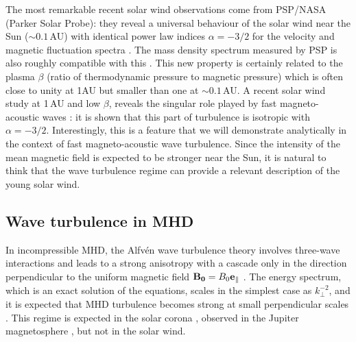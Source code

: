 \documentclass{jpp}
\begin{document}
The most remarkable recent solar wind observations come from PSP/NASA (Parker Solar Probe): they reveal a universal behaviour of the solar wind near the Sun ($\sim 0.1$\,AU) with identical power law indices $\alpha = -3/2$ for the velocity and magnetic fluctuation spectra \citep{Chen2020,Shi2021,Zhao2022}. The mass density spectrum measured by PSP is also roughly compatible with this \citep{Moncuquet2020,Zank2022}. This new property is certainly related to the plasma $\beta$ (ratio of thermodynamic pressure to magnetic pressure) which is often close to unity at 1AU but smaller than one at $\sim 0.1$\,AU. A recent solar wind study at 1\,AU and low $\beta$, reveals the singular role played by fast magneto-acoustic waves \citep{Zhao2022b}: it is shown that this part of turbulence is isotropic with $\alpha = -3/2$. Interestingly, this is a feature that we will demonstrate analytically in the context of fast magneto-acoustic wave turbulence. Since the intensity of the mean magnetic field is expected to be stronger near the Sun, it is natural to think that the wave turbulence regime can provide a relevant description of the young solar wind. 


\subsection{Wave turbulence in MHD}
In incompressible MHD, the Alfvén wave turbulence theory involves three-wave interactions and leads to a strong anisotropy with a cascade only in the direction perpendicular to the uniform magnetic field ${\bf B_0} = B_0 {\bf e_\parallel}$ \citep{Galtier2000,GaltierChandran2006}. The energy spectrum, which is an exact solution of the equations, scales in the simplest case as $k_\perp^{-2}$, and it is expected that MHD turbulence becomes strong at small perpendicular scales \citep{Meyrand2016}. This regime is expected in the solar corona \citep{Bigot2008c,Rappazzo2007}, observed in the Jupiter magnetosphere \citep{Saur2002}, but not in the solar wind. 
\end{document}
